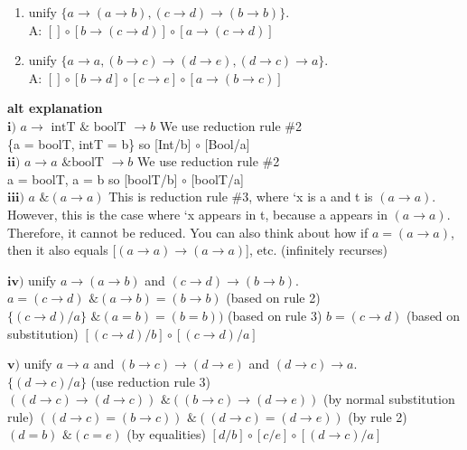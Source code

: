 \documentclass[letterpaper, 8pt]{extarticle}
\begin{document}
\begin{multicols*}{4}
\begin{enumerate}
        \item unify $\{a \to (a \to b), (c \to d) \to (b \to b)  \}$. \\
              A: $[] \circ [b \to (c \to d)] \circ [a \to (c \to d)]$

        \item unify $\{a \to a, (b \to c) \to (d \to e), (d \to c) \to a \}$. \\
              A: $[] \circ [b \to d] \circ [c \to e] \circ [a \to (b \to c)]$
    \end{enumerate}

    \textbf{alt explanation} \\
    $\textbf{i)}$ $a \to \text{ intT } \& \text{ boolT } \to b$
    We use reduction rule \#2\\
    \{a = boolT, intT = b\}  so [Int/b] $\circ$ [Bool/a]\\
    $\textbf{ii)}$  $a \to  a \text{ \& boolT } \to  b$
    We use reduction rule \#2\\
    {a = boolT, a  = b}   so  [boolT/b] $\circ$ [boolT/a]\\
    $\textbf{iii)}$ $a \text{ \& } (a \to a)$
    This is reduction rule \#3, where ‘x is a and t is $(a \to a)$. However, this is the case where
    ‘x appears in t, because a appears in $(a \to a)$.
    Therefore, it cannot be reduced. You can also think about how if $a = (a \to a)$,
    then it also equals [$(a \to a) \to (a \to a)$], etc. (infinitely recurses)

    $\textbf{iv)}$ unify $a \to (a \to b)$ and $(c \to d) \to (b \to b)$.
    $a = (c \to d)   \text{ \& }  (a \to b) = (b \to b)$ (based on rule 2)
    $\{(c \to d)/a\} \text{ \& }  (a=b) = (b=b))$ (based on rule 3)
    $b = (c \to d)$  (based on substitution)
    $[(c \to d)/b] \circ [(c \to d)/a]$

    $\textbf{v)}$ unify $a \to a$ and $(b \to c) \to (d \to e)$ and $(d \to c) \to a$.\\
    $\{(d \to c) / a\}$  (use reduction rule 3)
    $((d \to c) \to (d \to c)) \text{ \& } ((b \to c) \to (d \to e))$  (by normal substitution rule)
    $((d \to c) = (b \to c)) \text{ \& } ((d \to c) = (d \to e))$  (by rule 2)
    $(d=b) \text{ \& } (c=e)$ (by equalities)
    $[d/b] \circ [c/e] \circ [(d \to c)/a]$


\end{multicols*}
\end{document}
